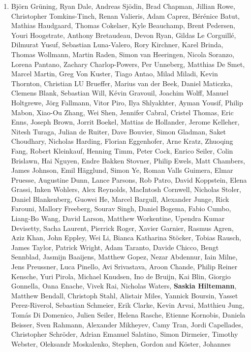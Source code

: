 \begin{enumerate}
\item Björn Grüning, Ryan  Dale, Andreas  Sjödin, Brad  Chapman, Jillian  Rowe, Christopher  Tomkins-Tinch, Renan  Valieris, Adam  Caprez, Bérénice  Batut, Mathias  Haudgaard, Thomas  Cokelaer, Kyle  Beauchamp, Brent  Pedersen, Youri  Hoogstrate, Anthony  Bretaudeau, Devon  Ryan, Gildas  Le Corguillé, Dilmurat  Yusuf, Sebastian  Luna-Valero, Rory  Kirchner, Karel  Brinda, Thomas  Wollmann, Martin  Raden, Simon  van Heeringen, Nicola  Soranzo, Lorena  Pantano, Zachary  Charlop-Powers, Per  Unneberg, Matthias  De Smet, Marcel  Martin, Greg  Von Kuster, Tiago  Antao, Milad  Miladi, Kevin  Thornton, Christian LU   Brueffer, Marius  van der Beek, Daniel  Maticzka, Clemens  Blank, Sebastian  Will, Kévin  Gravouil, Joachim  Wolff, Manuel  Holtgrewe, Jörg  Fallmann, Vitor  Piro, Ilya  Shlyakhter, Ayman  Yousif, Philip  Mabon, Xiao-Ou  Zhang, Wei  Shen, Jennifer  Cabral, Cristel  Thomas, Eric  Enns, Joseph  Brown, Jorrit  Boekel, Mattias  de Hollander, Jerome  Kelleher, Nitesh  Turaga, Julian  de Ruiter, Dave  Bouvier, Simon  Gladman, Saket  Choudhary, Nicholas  Harding, Florian  Eggenhofer, Arne  Kratz, Zhuoqing  Fang, Robert  Kleinkauf, Henning  Timm, Peter  Cock, Enrico  Seiler, Colin  Brislawn, Hai  Nguyen, Endre  Bakken Stovner, Philip  Ewels, Matt  Chambers, James  Johnson, Emil  Hägglund, Simon  Ye, Roman  Valls Guimera, Elmar  Pruesse, Augustine  Dunn, Lance  Parsons, Rob  Patro, David  Koppstein, Elena  Grassi, Inken  Wohlers, Alex  Reynolds, MacIntosh  Cornwell, Nicholas  Stoler, Daniel  Blankenberg, Guowei  He, Marcel  Bargull, Alexander  Junge, Rick  Farouni, Mallory  Freeberg, Sourav  Singh, Daniel  Bogema, Fabio  Cumbo, Liang-Bo  Wang, David  Larson, Matthew  Workentine, Upendra  Kumar Devisetty, Sacha  Laurent, Pierrick  Roger, Xavier  Garnier, Rasmus  Agren, Aziz  Khan, John  Eppley, Wei  Li, Bianca Katharina  Stöcker, Tobias  Rausch, James  Taylor, Patrick  Wright, Adam  Taranto, Davide  Chicco, Bengt  Sennblad, Jasmijn  Baaijens, Matthew  Gopez, Nezar  Abdennur, Iain  Milne, Jens  Preussner, Luca  Pinello, Avi  Srivastava, Aroon  Chande, Philip Reiner  Kensche, Yuri  Pirola, Michael  Knudsen, Ino  de Bruijn, Kai  Blin, Giorgio  Gonnella, Oana  Enache, Vivek  Rai, Nicholas  Waters, \textbf{Saskia Hiltemann}, Matthew Bendall, Christoph  Stahl, Alistair  Miles, Yannick  Boursin, Yasset  Perez-Riverol, Sebastian  Schmeier, Erik  Clarke, Kevin  Arvai, Matthieu  Jung, Tomás  Di Domenico, Julien  Seiler, Helena  Rasche, Etienne  Kornobis, Daniela  Beisser, Sven  Rahmann, Alexander  Mikheyev, Camy  Tran, Jordi  Capellades, Christopher  Schröder, Adrian Emanuel  Salatino, Simon  Dirmeier, Timothy  Webster, Oleksandr  Moskalenko, Stephen, Gordon and Köster, Johannes {\color{chaptergrey}{Bioconda: A sustainable and comprehensive software distribution for the life sciences.}}


\end{enumerate}
